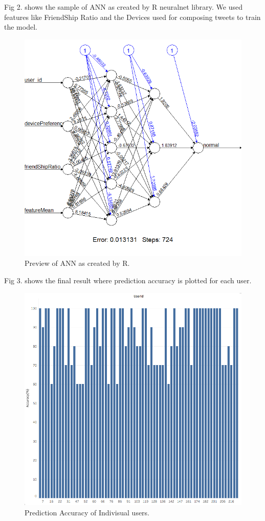 \documentclass[conference]{IEEEtran}
\begin{document}
 Fig 2. shows the sample of ANN as created by R neuralnet library. We used features like FriendShip Ratio and the Devices used for composing tweets 
 to train the model.
 

\begin{figure}[h!]
  \includegraphics[scale=0.4]{sample_ann1}
  \caption{Preview of ANN as created by R.}
\end{figure}

Fig 3. shows the final result where prediction accuracy is plotted for each user.

\begin{figure}[h!]
  \includegraphics[scale=0.4]{AccuracyMatrix}
  \caption{ Prediction Accuracy of Indivisual users.}
\end{figure}
\end{document}
